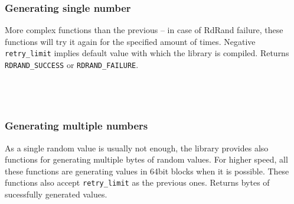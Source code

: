 \\

\\

\\

\subsubsection{Generating single number}\label{subsec:api:single-number}
More complex functions than the previous -- in case of RdRand failure, these functions will try it again for the specified amount of times. Negative {\tt retry\_limit} implies default value with which the library is compiled. Returns {\tt RDRAND\_SUCCESS} or {\tt RDRAND\_FAILURE}.\\


\\

\\

\\

\subsubsection{Generating multiple numbers}\label{subsec:api:multiple}
As a single random value is usually not enough, the library provides also functions for generating multiple bytes of random values. For higher speed, all these functions are generating values in 64bit blocks when it is possible.
These functions also accept {\tt retry\_limit} as the previous ones. Returns bytes of sucessfully generated values.\\


\\


